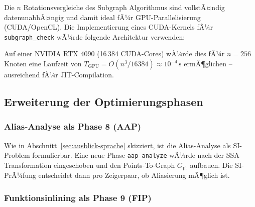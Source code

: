 ﻿\documentclass[a4paper,12pt]{article}
\theoremstyle{definition}
\begin{document}
Die $n$ Rotationsvergleiche des Subgraph Algorithmus sind vollstÃ¤ndig
datenunabhÃ¤ngig und damit ideal fÃ¼r GPU-Parallelisierung (CUDA/OpenCL).
Die Implementierung eines CUDA-Kernels fÃ¼r \texttt{subgraph\_check}
wÃ¼rde folgende Architektur verwenden:

\begin{center}
\end{center}

Auf einer NVIDIA RTX 4090 (16\,384 CUDA-Cores) wÃ¼rde dies fÃ¼r $n = 256$
Knoten eine Laufzeit von
$T_{\mathrm{GPU}} = O(n^3 / 16384) \approx 10^{-4}\,\text{s}$
ermÃ¶glichen -- ausreichend fÃ¼r JIT-Compilation.

\subsection{Erweiterung der Optimierungsphasen}
\label{sec:ausblick-opt}

\subsubsection{Alias-Analyse als Phase 8 (AAP)}

Wie in Abschnitt~\ref{sec:ausblick-sprache} skizziert, ist die
Alias-Analyse als SI-Problem formulierbar. Eine neue Phase
\texttt{aap\_analyze} wÃ¼rde nach der SSA-Transformation eingeschoben
und den Points-To-Graph $G_{\mathrm{pt}}$ aufbauen. Die SI-PrÃ¼fung
entscheidet dann pro Zeigerpaar, ob Aliasierung mÃ¶glich ist.

\subsubsection{Funktionsinlining als Phase 9 (FIP)}
\end{document}
